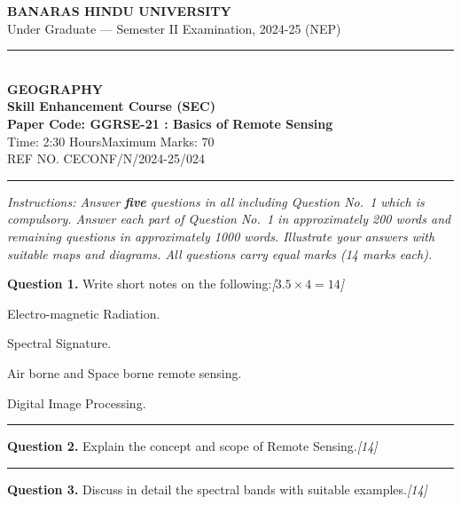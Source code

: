 \documentclass[11pt,a4paper]{article}
\newcommand{\pts}[1]{\hfill   \textit{[#1]}}
\begin{document}
\begin{center}
  {\large\bfseries BANARAS HINDU UNIVERSITY}\\[2pt]
  {\normalsize Under Graduate --- Semester II Examination, 2024-25 (NEP)}\\[6pt]
  \rule{0.8\linewidth}{0.5pt}\\[6pt]
  {\large\bfseries GEOGRAPHY}\\[4pt]
  {\large\bfseries Skill Enhancement Course (SEC)}\\[4pt]
  {\large\bfseries Paper Code: GGRSE-21 : Basics of Remote Sensing}\\[4pt]
  {\normalsize Time: 2:30 Hours\hfill Maximum Marks: 70}\\[2pt]
  {\small REF NO. CECONF/N/2024-25/024}
\end{center}

\rule{\linewidth}{0.4pt}

\smallskip



\noindent   \textit{Instructions: Answer   \textbf{five} questions in all including Question No.~1 which is compulsory. Answer each part of Question No.~1 in approximately 200 words and remaining questions in approximately 1000 words. Illustrate your answers with suitable maps and diagrams. All questions carry equal marks (14 marks each).}

\bigskip




\noindent   \textbf{Question 1.} Write short notes on the following:\pts{$3.5  \times 4 = 14$}

\begin{parts}
  \item Electro-magnetic Radiation.
  \item Spectral Signature.
  \item Air borne and Space borne remote sensing.
  \item Digital Image Processing.
\end{parts}

\medskip\rule{\linewidth}{0.2pt}\medskip




\noindent   \textbf{Question 2.} Explain the concept and scope of Remote Sensing.\pts{14}

\medskip\rule{\linewidth}{0.2pt}\medskip




\noindent   \textbf{Question 3.} Discuss in detail the spectral bands with suitable examples.\pts{14}
\end{document}
